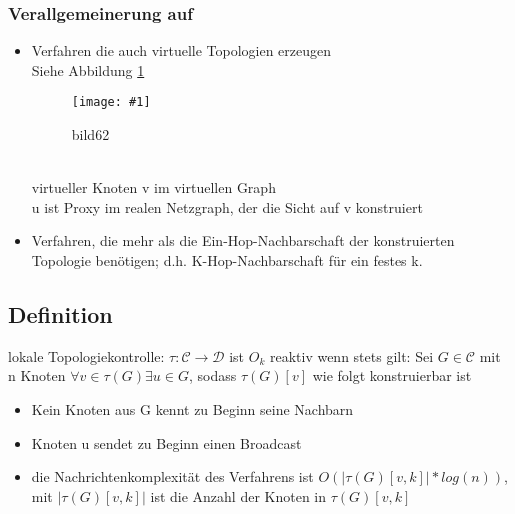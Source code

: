 \documentclass{article}
\newcommand{\bild}[4]{ %
	\begin{figure}[h!]
		\centering
		\texttt{[image: \#1]}
		\caption{#3}
		\label{#4}
	\end{figure}	
}
\newcommand{\sieheBild}[4]{
	Siehe Abbildung \ref{#4}
	\bild{#1}{#2}{#3}{#4}
}
\begin{document}
\subsubsection{Verallgemeinerung auf}
\begin{itemize}
	\item Verfahren die auch virtuelle Topologien erzeugen
	\\
	\sieheBild{Bilder/62.png}{0.4}{bild62}{Bild 62}
	\\
	virtueller Knoten v im virtuellen Graph\\
	u ist Proxy im realen Netzgraph, der die Sicht auf v konstruiert\\
	\item Verfahren, die mehr als die Ein-Hop-Nachbarschaft der konstruierten Topologie benötigen; d.h. K-Hop-Nachbarschaft für ein festes k.
\end{itemize}

\subsection{Definition}
lokale Topologiekontrolle: $\tau: \mathcal{C} \rightarrow \mathcal{D}$ ist $O_k$ reaktiv wenn stets gilt: Sei $G \in \mathcal{C}$ mit n Knoten $\forall v \in \tau(G) \exists u \in G$, sodass $\tau(G)[v]$ wie folgt konstruierbar ist
\begin{itemize}
	\item Kein Knoten aus G kennt zu Beginn seine Nachbarn
	\item Knoten u sendet zu Beginn einen Broadcast
	\item die Nachrichtenkomplexität des Verfahrens ist $O(|\tau(G) [v,k]| * log(n))$, mit $|\tau(G)[v,k]|$ ist die Anzahl der Knoten in $\tau(G)[v,k]$
\end{itemize}
\end{document}
